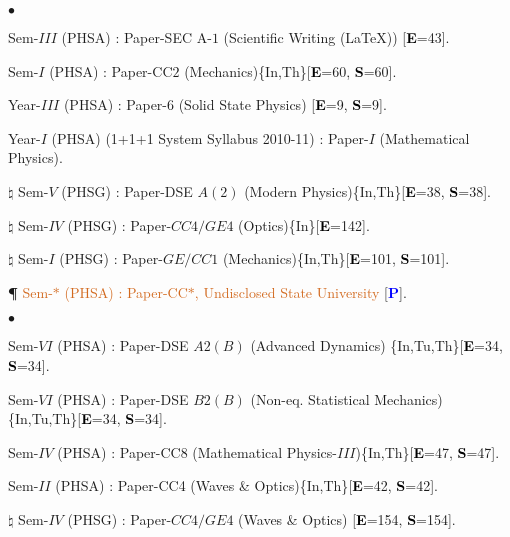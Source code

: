\documentclass[margin,line]{res}
\newenvironment{list1}{
  \begin{list}{\ding{113}}{%
      \setlength{\itemsep}{0in}
      \setlength{\parsep}{0in} \setlength{\parskip}{0in}
      \setlength{\topsep}{0in} \setlength{\partopsep}{0in} 
      \setlength{\leftmargin}{0.17in}}}{\end{list}}
\newenvironment{list2}{
  \begin{list}{$\bullet$}{%
      \setlength{\itemsep}{0in}
      \setlength{\parsep}{0in} \setlength{\parskip}{0in}
      \setlength{\topsep}{0in} \setlength{\partopsep}{0in} 
      \setlength{\leftmargin}{0.2in}}}{\end{list}}
\begin{document}
\begin{resume}
\begin{list2}
\item Sem-$III$ (PHSA) : Paper-SEC A-$1$ (Scientific Writing (\LaTeX)) [\textcolor{black}{\bf E}=43]. 
\item Sem-$I$ (PHSA) : Paper-CC$2$ (Mechanics)\textcolor{alizarin}{\{In,Th\}}[\textcolor{black}{\bf E}=60, \textcolor{black}{\bf S}=60]. 
\item Year-$III$ (PHSA) : Paper-6 (Solid State Physics) [\textcolor{black}{\bf E}=9, \textcolor{black}{\bf S}=9]. 
\item Year-$I$ (PHSA) (1+1+1 System Syllabus 2010-11) : Paper-$I$ (Mathematical Physics). 
\item[$\pmb{\natural}$] Sem-$V$ (PHSG) : Paper-DSE $A(2)$ (Modern Physics)\textcolor{alizarin}{\{In,Th\}}[\textcolor{black}{\bf E}=38, \textcolor{black}{\bf S}=38].
\item[$\pmb{\natural}$] Sem-$IV$ (PHSG) : Paper-$CC4/GE4$ (Optics)\textcolor{alizarin}{\{In\}}[\textcolor{black}{\bf E}=142]. 
\item[$\pmb{\natural}$] Sem-$I$ (PHSG) : Paper-$GE/CC1$ (Mechanics)\textcolor{alizarin}{\{In,Th\}}[\textcolor{black}{\bf E}=101, 
      \textcolor{black}{\bf S}=101]. 
\item[{\bf \P}] \textcolor{chocolate}{Sem-$*$ (PHSA) : Paper-CC$*$, Undisclosed State University} [\textcolor{blue}{\bf P}]. 
\end{list2}
\begin{list1}
\item[] \textcolor{iris}{}
\vspace{1mm}
\end{list1}
\begin{list2}
\item Sem-$VI$ (PHSA) : Paper-DSE $A2(B)$ (Advanced Dynamics) \textcolor{alizarin}{\{In,Tu,Th\}}[\textcolor{black}{\bf E}=34, 
      \textcolor{black}{\bf S}=34].
\item Sem-$VI$ (PHSA) : Paper-DSE $B2(B)$ (Non-eq. Statistical Mechanics)\textcolor{alizarin}{\{In,Tu,Th\}}[\textcolor{black}{\bf E}=34, 
      \textcolor{black}{\bf S}=34].
\item Sem-$IV$ (PHSA) : Paper-CC8 (Mathematical Physics-$III$)\textcolor{alizarin}{\{In,Th\}}[\textcolor{black}{\bf E}=47, \textcolor{black}{\bf S}=47]. 
\item Sem-$II$ (PHSA) : Paper-CC4 (Waves \& Optics)\textcolor{alizarin}{\{In,Th\}}[\textcolor{black}{\bf E}=42, \textcolor{black}{\bf S}=42]. 
\item[$\pmb{\natural}$] Sem-$IV$ (PHSG) : Paper-$CC4/GE4$ (Waves \& Optics) [\textcolor{black}{\bf E}=154, \textcolor{black}{\bf S}=154]. 

\end{list2}
\end{resume}
\end{document}
